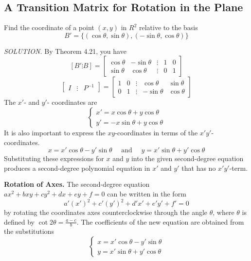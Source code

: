 \documentclass{article}
\newcommand\B{\textbf}
\newcommand\T{\textit}
\newcommand\tcl{\begin{tcolorbox}[colback = {blue9}]}
\newcommand\etcl{\end{tcolorbox}}
\begin{document}
    \subsection{A Transition Matrix for Rotation in the Plane}
    Find the coordinate of  a point $(x,y)$ in $R^2$ relative to the basis 
    \[ B' = \{ (\cos{\theta}, \sin{\theta}), (-\sin{\theta}, \cos{\theta})\} \]

    \T{SOLUTION.} By Theorem 4.21, you have
    \[ [B' \vdots B] = 
        \begin{bmatrix}
            \cos{\theta} & -\sin{\theta} & \vdots & 1 & 0 \\
            \sin{\theta} & \cos{\theta} & \vdots & 0 &  1
        \end{bmatrix} \]
    \[ \begin{bmatrix}
        I & \vdots & P^{-1}
    \end{bmatrix} = 
    \begin{bmatrix}
        1  & 0 & \vdots & \cos{\theta} & \sin{\theta} \\
        0 & 1 & \vdots & -\sin{\theta} & \cos{\theta}
    \end{bmatrix} \]
    The $x'$- and $y'$- coordinates are 
    \[\begin{cases} 
        x' = x \cos{\theta} + y\cos{\theta}\\
        y' = -x\sin{\theta} + y\cos{\theta}
    \end{cases}\]
    It is also important to express the $xy$-coordinates in terms of the $x'y'$-coordinates. 
    \[ x = x'\cos{\theta} - y'\sin{\theta} \quad \text{ and  } \quad y = x'\sin{\theta} + y'\cos{\theta}\]
    Substituting these expressions for $x$ and $y$ into the given second-degree equation produces
    a second-degree polynomial equation in $x'$ and $y'$ that has no $x'y'$-term.

    \tcl
    \B{Rotation of Axes.}
        The second-degree equation $ax^2 + bxy + cy^2 + dx + ey + f = 0$ can be written in the form
        \[ a'(x')^2 + c'(y')^2 + d'x' + e'y' + f' = 0 \]
        by rotating the coordinates axes counterclockwise through the angle $\theta$, where $\theta$ is defined by
        $\cot{2\theta} = \frac{a - c}{b}$. The coefficients of the new equation are obtained from
        the substitutions
        \[ \begin{cases}{}
            x = x'\cos{\theta} - y'\sin{\theta} \\
            y = x'\sin{\theta} + y'\cos{\theta}
        \end{cases} \]
    \etcl 











    
\end{document}
